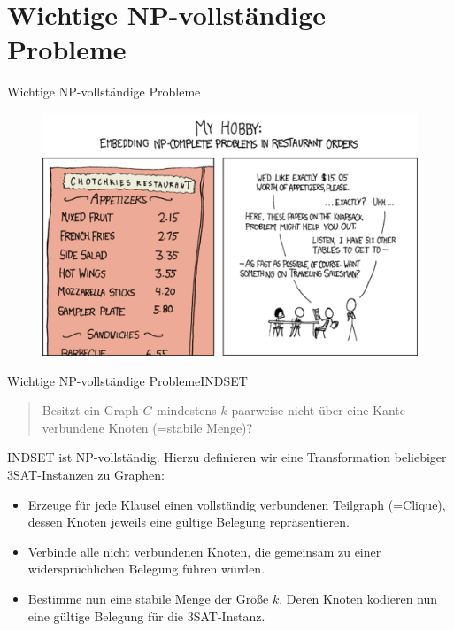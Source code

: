 \documentclass[ignorenonframetext,]{beamer}
\begin{document}
\section[Probleme]{Wichtige NP-vollständige Probleme}

\begin{frame}{Wichtige NP-vollständige Probleme}

\begin{figure}[htbp]
\centering
\includegraphics{img/xkcd_np_complete_big.png}
\end{figure}

\end{frame}

\begin{frame}{Wichtige NP-vollständige Probleme}{INDSET}

\begin{quote}
	Besitzt ein Graph $G$ mindestens $k$ paarweise nicht über eine Kante
verbundene Knoten (=stabile Menge)?
\end{quote}

INDSET ist NP-vollständig. Hierzu definieren wir eine Transformation
beliebiger 3SAT-Instanzen zu Graphen:

\begin{itemize}
\itemsep1pt\parskip0pt
\item
  Erzeuge für jede Klausel einen vollständig verbundenen Teilgraph
  (=Clique), dessen Knoten jeweils eine gültige Belegung repräsentieren.
\item
  Verbinde alle nicht verbundenen Knoten, die gemeinsam zu einer
  widersprüchlichen Belegung führen würden.
\item
  Bestimme nun eine stabile Menge der Größe $k$. Deren Knoten kodieren
  nun eine gültige Belegung für die 3SAT-Instanz.
\end{itemize}

\end{frame}
\end{document}
